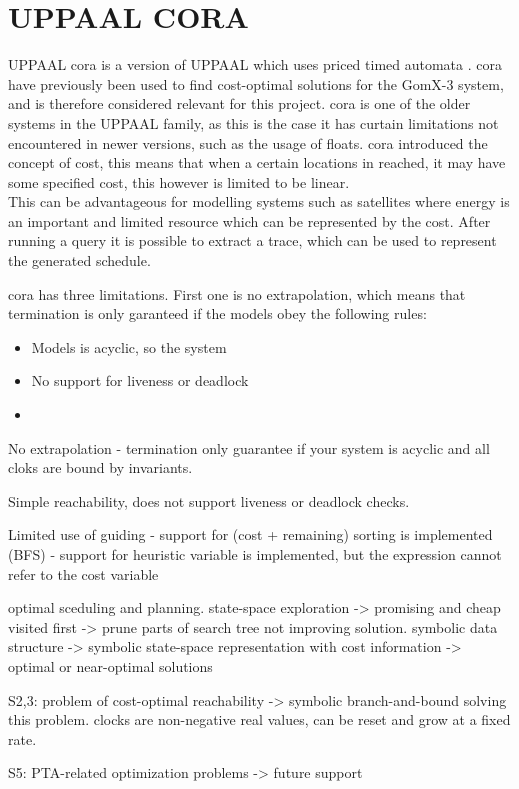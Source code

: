 \section{UPPAAL CORA}
UPPAAL \gls{cora} is a version of UPPAAL which uses priced timed automata \cite{cs_cora}. \Gls{cora} have previously been used to find cost-optimal solutions for the GomX-3 system\cite{gomx3}, and is therefore considered relevant for this project.
\Gls{cora} is one of the older systems in the UPPAAL family, as this is the case it has curtain limitations not encountered in newer versions, such as the usage of floats. 
\Gls{cora} introduced the concept of cost, this means that when a certain locations in reached, it may have some specified cost, this however is limited to be linear. \\
This can be advantageous for modelling systems such as satellites where energy is an important and limited resource which can be represented by the cost. After running a query it is possible to extract a trace, which can be used to represent the generated schedule.


\gls{cora} has three limitations. First one is no extrapolation, which means that termination is only garanteed if the models obey the following rules: 
\begin{itemize}
	\item Models is acyclic, so the system
	\item No support for liveness or deadlock
	\item 
\end{itemize}


No extrapolation - termination only guarantee if your system is acyclic and all cloks are bound by invariants.

Simple reachability, does not support liveness or deadlock checks.

Limited use of guiding
- support for (cost + remaining) sorting is implemented (BFS)
- support for heuristic variable is implemented, but the expression cannot refer to the cost variable



optimal sceduling and planning.
state-space exploration -> promising and cheap visited first -> prune parts of search tree not improving solution.
symbolic data structure -> symbolic state-space representation with cost information -> optimal or near-optimal solutions

S2,3: problem of cost-optimal reachability -> symbolic branch-and-bound solving this problem.
 clocks are non-negative real values, can be reset and grow at a fixed rate.

S5: PTA-related optimization problems -> future support

